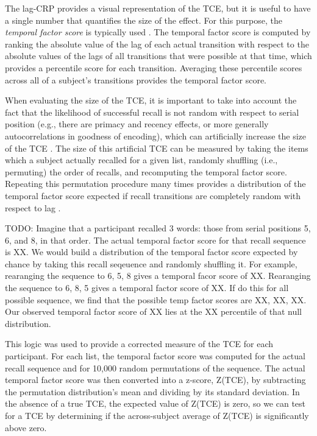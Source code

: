 \documentclass[jou,natbib,floatsintext]{apa6} %
\begin{document}
The lag-CRP provides a visual representation of the TCE, but it is useful to have a single number that quantifies the size of the effect. For this purpose, the \emph{temporal factor score} is typically used \citep{SedeEtal10,PolyEtal09}. The temporal factor score is computed by ranking the absolute value of the lag of each actual transition with respect to the absolute values of the lags of all transitions that were possible at that time, which provides a percentile score for each transition. Averaging these percentile scores across all of a subject's transitions provides the temporal factor score.
 
When evaluating the size of the TCE, it is important to take into account the fact that the likelihood of successful recall is not random with respect to serial position (e.g., there are primacy and recency effects, or more generally autocorrelations in goodness of encoding), which can artificially increase the size of the TCE \citep{HealKaha17,Hint16}. The size of this artificial TCE can be measured by taking the items which a subject actually recalled for a given list, randomly shuffling (i.e., permuting) the order of recalls, and recomputing the temporal factor score. Repeating this permutation procedure many times provides a distribution of the temporal factor score expected if recall transitions are completely random with respect to lag \citep{HealKaha17}. 

TODO:
Imagine that a participant recalled 3 words: those from serial positions 5, 6, and 8, in that order. The actual temporal factor score for that recall sequence is XX. We would build a distribution of the temporal factor score expected by chance by taking this recall seqeuence and randomly shuffling it. For example, rearanging the sequence to 6, 5, 8 gives a temporal facor score of XX. Rearanging the sequence to 6, 8, 5 gives a temporal factor score of XX. If do this for all possible sequence, we find that the possible temp factor scores are XX, XX, XX. Our observed temporal factor score of XX lies at the XX percentile of that null distribution.


This logic was used to provide a corrected measure of the TCE for each participant. For each list, the temporal factor score was computed for the actual recall sequence and for 10,000 random permutations of the sequence. The actual temporal factor score was then converted into a z-score, Z(TCE), by subtracting the permutation distribution's mean and dividing by its standard deviation. In the absence of a true TCE, the expected value of Z(TCE) is zero, so we can test for a TCE by determining if the across-subject average of Z(TCE) is significantly above zero.   
\end{document}
